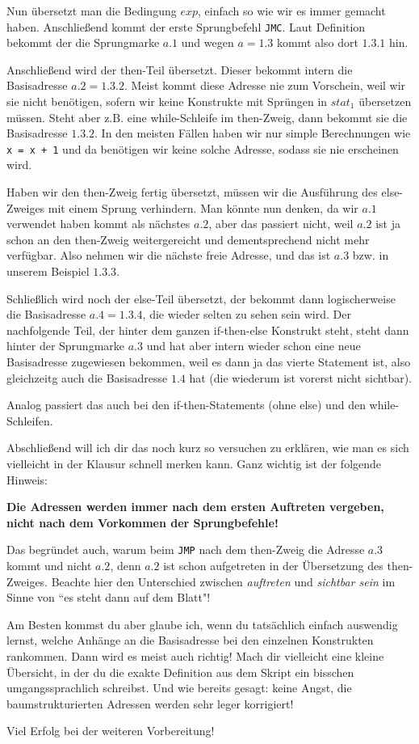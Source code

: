 \documentclass[ngerman,a4paper, 12pt]{article}
\begin{document}
	Nun übersetzt man die Bedingung $exp$, einfach so wie wir es immer gemacht haben. Anschließend kommt der erste Sprungbefehl \texttt{JMC}. Laut Definition bekommt der die Sprungmarke $a.1$ und wegen $a=1.3$ kommt also dort $1.3.1$ hin. 
	
	Anschließend wird der then-Teil übersetzt. Dieser bekommt intern die Basisadresse $a.2 = 1.3.2$. Meist kommt diese Adresse nie zum Vorschein, weil wir sie nicht benötigen, sofern wir keine Konstrukte mit Sprüngen in $stat_1$ übersetzen müssen. Steht aber z.B. eine while-Schleife im then-Zweig, dann bekommt sie die Basisadresse $1.3.2$. In den meisten Fällen haben wir nur simple Berechnungen wie \texttt{x = x + 1} und da benötigen wir keine solche Adresse, sodass sie nie erscheinen wird. 
	
	Haben wir den then-Zweig fertig übersetzt, müssen wir die Ausführung des else-Zweiges mit einem Sprung verhindern. Man könnte nun denken, da wir $a.1$ verwendet haben kommt als nächstes $a.2$, aber das passiert nicht, weil $a.2$ ist ja schon an den then-Zweig weitergereicht und dementsprechend nicht mehr verfügbar. Also nehmen wir die nächste freie Adresse, und das ist $a.3$ bzw. in unserem Beispiel $1.3.3$.
	
	Schließlich wird noch der else-Teil übersetzt, der bekommt dann logischerweise die Basisadresse $a.4 = 1.3.4$, die wieder selten zu sehen sein wird. Der nachfolgende Teil, der hinter dem ganzen if-then-else Konstrukt steht, steht dann hinter der Sprungmarke $a.3$ und hat aber intern wieder schon eine neue Basisadresse zugewiesen bekommen, weil es dann ja das vierte Statement ist, also gleichzeitg auch die Basisadresse $1.4$ hat (die wiederum ist vorerst nicht sichtbar).
	
	Analog passiert das auch bei den if-then-Statements (ohne else) und den while-Schleifen.
	
	Abschließend will ich dir das noch kurz so versuchen zu erklären, wie man es sich vielleicht in der Klausur schnell merken kann. Ganz wichtig ist der folgende Hinweis:
	
	\begin{center}
		\bfseries Die Adressen werden immer nach dem ersten Auftreten vergeben, nicht nach dem Vorkommen der Sprungbefehle!
	\end{center}
	
	Das begründet auch, warum beim \texttt{JMP} nach dem then-Zweig die Adresse $a.3$ kommt und nicht $a.2$, denn $a.2$ ist schon aufgetreten in der Übersetzung des then-Zweiges. Beachte hier den Unterschied zwischen \textit{auftreten} und \textit{sichtbar sein} im Sinne von ``es steht dann auf dem Blatt"! 
	
	Am Besten kommst du aber glaube ich, wenn du tatsächlich einfach auswendig lernst, welche Anhänge an die Basisadresse bei den einzelnen Konstrukten rankommen. Dann wird es meist auch richtig! Mach dir vielleicht eine kleine Übersicht, in der du die exakte Definition aus dem Skript ein bisschen umgangssprachlich schreibst.
	Und wie bereits gesagt: keine Angst, die baumstrukturierten Adressen werden sehr leger korrigiert!
	
	Viel Erfolg bei der weiteren Vorbereitung!
\end{document}
